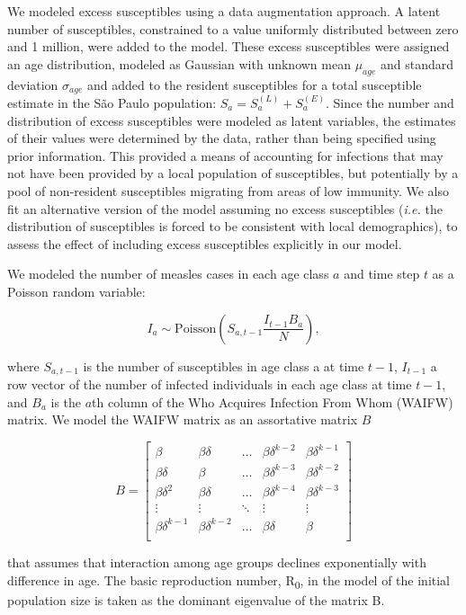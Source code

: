 We modeled excess susceptibles using a data augmentation approach. A latent number of susceptibles, constrained to a value uniformly distributed between zero and 1 million, were added to the model. These excess susceptibles were assigned an age distribution, modeled as Gaussian with unknown mean \(\mu_{age}\) and standard deviation \(\sigma_{age}\) and added to the resident susceptibles for a total susceptible estimate in the S\~{a}o Paulo population: \(S_a = S_a^{(L)} + S_a^{(E)}\). Since the number and distribution of excess susceptibles were modeled as latent variables, the estimates of their values were determined by the data, rather than being specified using prior information. This provided a means of accounting for infections that may not have been provided by a local population of susceptibles, but potentially by a pool of non-resident susceptibles migrating from areas of low immunity. We also fit an alternative version of the model assuming no excess susceptibles (\emph{i.e.} the distribution of susceptibles is forced to be consistent with local demographics), to assess the effect of including excess susceptibles explicitly in our model.

We modeled the number of measles cases in each age class \(a\) and time step \(t\) as a Poisson random variable:

\[I_a \sim \text{Poisson}\left(S_{a,t-1} \frac{I_{t-1}B_a}{N} \right),\] 

where \(S_{a,t-1}\) is the number of susceptibles in age class a at time \(t-1\), \(I_{t-1}\) a row vector of the number of infected individuals in each age class at time \(t-1\), and \(B_a\) is the \(a\)th column of the Who Acquires Infection From Whom (WAIFW) matrix.  We model the WAIFW matrix as an assortative matrix \(B\)

\[B = \left[{
\begin{array}{c}
  {\beta} & {\beta \delta} & \ldots & {\beta \delta^{k-2}} & {\beta \delta^{k-1}}  \\
  {\beta \delta} & {\beta} & \ldots & {\beta \delta^{k-3}} & {\beta \delta^{k-2}} \\
{\beta \delta^2} & {\beta \delta} & \ldots & {\beta \delta^{k-4}} & {\beta \delta^{k-3}}  \\
  \vdots & \vdots & \ddots & \vdots & \vdots \\
  {\beta \delta^{k-1}} & {\beta \delta^{k-2}} & \ldots & {\beta \delta} & {\beta}  \\
\end{array}
}\right]\]

that assumes that interaction among age groups declines exponentially with difference in age. The basic reproduction number, R\textsubscript{0}, in the model of the initial population size is taken as the dominant eigenvalue of the matrix B.